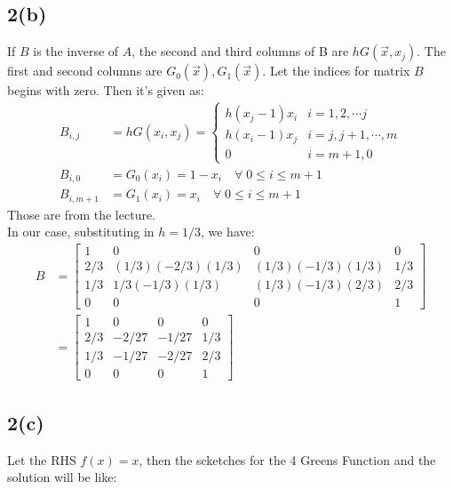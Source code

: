 \documentclass[]{article}
\begin{document}
    \subsection*{2(b)}
        If $B$ is the inverse of $A$, the second and third columns of B are $hG(\vec{x}, x_j)$. The first and second columns are $G_0(\vec{x}), G_1(\vec{x})$. Let the indices for matrix $B$ begins with zero. Then it's given as: 
        \begin{align*}\tag{2.b.1}\label{eqn:2.b.1}
            B_{i, j} &= 
            hG(x_i, x_j) = 
            \begin{cases}
                h(x_j- 1)x_i & i = 1, 2, \cdots j
                \\
                h(x_i - 1)x_j & i = j, j+ 1, \cdots, m
                \\
                0 & i = m + 1, 0
            \end{cases}
            \\
            B_{i, 0} &= G_0(x_i) = 1 - x_i \quad \forall \; 0\le i \le m + 1
            \\
            B_{i, m + 1} &= G_1(x_i) = x_i \quad \forall \;0 \le i \le m + 1
        \end{align*}
        Those are from the lecture.
        \\
        In our case, substituting in $h = 1/3$, we have: 
        \begin{align*}\tag{2.b.2}\label{eqn:2.b.2}
            B&= \begin{bmatrix}
                1 & 0 & 0 & 0 \\
                2/3& (1/3)(-2/3)(1/3) &(1/3)(-1/3)(1/3) & 1/3
                \\
                1/3 & 1/3(-1/3)(1/3) & (1/3)(-1/3)(2/3) & 2/3
                \\
                0 & 0& 0& 1
            \end{bmatrix}
            \\
            &=  
            \begin{bmatrix}
                1 & 0 & 0 & 0 \\
                2/3& -2/27 & -1/27 & 1/3
                \\
                1/3 & -1/27 & -2/27 & 2/3
                \\
                0 & 0& 0& 1
            \end{bmatrix}
        \end{align*}
    \subsection*{2(c)}
    Let the RHS $f(x) = x$, then the scketches for the 4 Greens Function and the solution will be like: 
\end{document}
